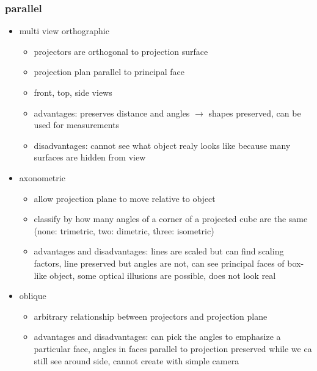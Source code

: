 \documentclass[11pt,a4paper]{article}
\begin{document}
	\subsubsection{parallel}
	\begin{itemize}
		\item multi view orthographic
		\begin{itemize}
			\item projectors are orthogonal to projection surface
			\item projection plan parallel to principal face
			\item front, top, side views
			\item advantages: preserves distance and angles $\rightarrow$ shapes preserved, can be used for measurements
			\item disadvantages: cannot see what object realy looks like because many surfaces are hidden from view
		\end{itemize}
		\item axonometric
		\begin{itemize}
			\item allow projection plane to move relative to object
			\item classify by how many angles of a corner of a projected cube are the same (none: trimetric, two: dimetric, three: isometric)
			\item advantages and disadvantages: lines are scaled but can find scaling factors, line preserved but angles are not, can see principal faces of box-like object, some optical illusions are possible, does not look real
		\end{itemize}
		\item oblique
		\begin{itemize}
			\item arbitrary relationship between projectors and projection plane
			\item advantages and disadvantages: can pick the angles to emphasize a particular face, angles in faces parallel to projection preserved while we ca still see around side, 
			cannot create with simple camera
		\end{itemize}
	\end{itemize}
\end{document}
